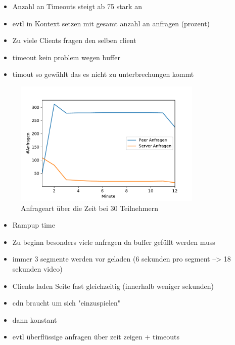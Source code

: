 \begin{itemize}
	\item Anzahl an Timeouts steigt ab 75 stark an
	\item evtl in Kontext setzen mit gesamt anzahl an anfragen (prozent)
	\item Zu viele Clients fragen den selben client
	\item timeout kein problem wegen buffer
	\item timout so gewählt das es nicht zu unterbrechungen kommt
\end{itemize}
\begin{figure}[!h]
	\centering
	\includegraphics[width=0.8\textwidth]{figures/peer_vs_server_over_time}
	\caption[A Figure Short-Title]{Anfrageart über die Zeit bei 30 Teilnehmern}
	\label{fig:peer_vs_server_over_time}
\end{figure}

\begin{itemize}
	\item Rampup time
	\item Zu beginn besonders viele anfragen da buffer gefüllt werden muss
	\item immer 3 segmente werden vor geladen (6 sekunden pro segment --> 18 sekunden video)
	\item Clients laden Seite fast gleichzeitig (innerhalb weniger sekunden)
	\item cdn braucht um sich "einzuspielen"
	\item dann konstant
	\item evtl überflüssige anfragen über zeit zeigen + timeouts 
\end{itemize}

